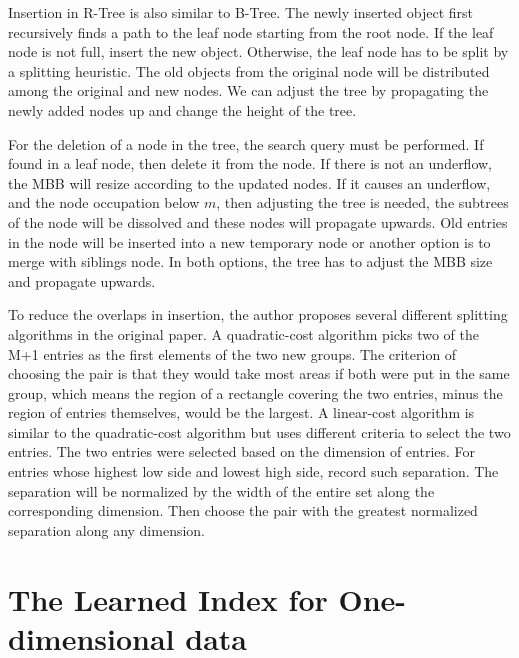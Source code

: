 Insertion in R-Tree is also similar to B-Tree. The newly inserted object first recursively finds a path to the leaf node starting from the root node. If the leaf node is not full, insert the new object. Otherwise, the leaf node has to be split by a splitting heuristic. The old objects from the original node will be distributed among the original and new nodes. We can adjust the tree by propagating the newly added nodes up and change the height of the tree. 

For the deletion of a node in the tree, the search query must be performed. If found in a leaf node, then delete it from the node. If there is not an underflow, the MBB will resize according to the updated nodes. If it causes an underflow, and the node occupation below ${m}$, then adjusting the tree is needed, the subtrees of the node will be dissolved and these nodes will propagate upwards. Old entries in the node will be inserted into a new temporary node or another option is to merge with siblings node. In both options, the tree has to adjust the MBB size and propagate upwards. 

To reduce the overlaps in insertion, the author proposes several different splitting algorithms in the original paper. A quadratic-cost algorithm picks two of the M+1 entries as the first elements of the two new groups. The criterion of choosing the pair is that they would take most areas if both were put in the same group, which means the region of a rectangle covering the two entries, minus the region of entries themselves, would be the largest. A linear-cost algorithm is similar to the quadratic-cost algorithm but uses different criteria to select the two entries. The two entries were selected based on the dimension of entries. For entries whose highest low side and lowest high side, record such separation. The separation will be normalized by the width of the entire set along the corresponding dimension. Then choose the pair with the greatest normalized separation along any dimension. 

\section{The Learned Index for One-dimensional data}

